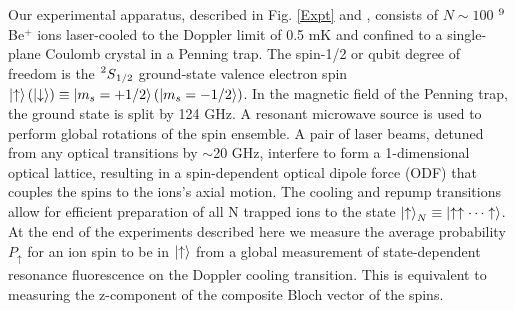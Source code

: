 \documentclass[aps,prl,twocolumn,superscriptaddress,floatfix]{revtex4-1}
\begin{document}
Our experimental apparatus, described in Fig. \ref{Expt} and \citep{Sawyer2014,Bohnet2015}, consists of $N\sim100$ $\prescript{9}{}{}$Be$^{+}$ ions laser-cooled to the Doppler limit of 0.5 mK and confined to a single-plane Coulomb crystal in a Penning trap. The spin-1/2 or qubit degree of freedom is the $\prescript{2}{}{S}_{1/2}$ ground-state valence electron spin $\ket{\uparrow} (\ket{\downarrow}) \equiv \ket{m_{s}=+1/2} (\ket{m_{s}=-1/2}) $. In the magnetic field of the Penning trap, the ground state is split by 124 GHz. A resonant microwave source is used to perform global rotations of the spin ensemble. A pair of laser beams, detuned from any optical transitions by $\sim$20 GHz, interfere to form a 1-dimensional optical lattice, resulting in a spin-dependent optical dipole force (ODF) that couples the spins to the ions's axial motion. The cooling and repump transitions allow for efficient preparation of all N trapped ions to the state $\ket{\uparrow}_N \equiv \ket{\uparrow \uparrow \cdots \uparrow}$. At the end of the experiments described here we measure the average probability $P_\uparrow$ for an ion spin to be in $\ket{\uparrow}$ from a global measurement of state-dependent resonance fluorescence on the Doppler cooling transition. This is equivalent to measuring the z-component of the composite Bloch vector of the spins.
\iffalse
\end{document}
